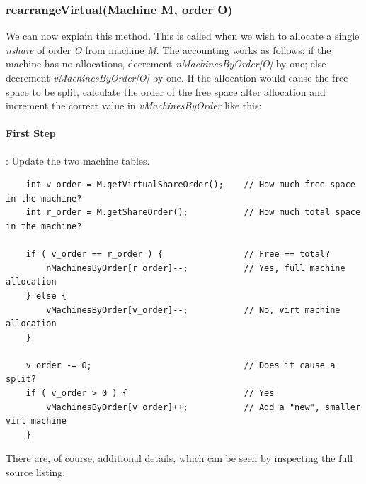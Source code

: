 \subsubsection{rearrangeVirtual(Machine M, order O)}
    We can now explain this method.  This is called when we wish to allocate a single
    {\em nshare} of order {\em O} from machine {\em M}.  The accounting works as follows:
    if the machine has no allocations, decrement {\em nMachinesByOrder[O]} by one; else
    decrement {\em vMachinesByOrder[O]} by one.  If the allocation would cause the 
    free space to be split, calculate the order of the free space after allocation and 
    increment the correct value in {\em vMachinesByOrder} like this:

    \paragraph{First Step}: Update the two machine tables.
\begin{verbatim}
    int v_order = M.getVirtualShareOrder();    // How much free space in the machine?
    int r_order = M.getShareOrder();           // How much total space in the machine?

    if ( v_order == r_order ) {                // Free == total?
        nMachinesByOrder[r_order]--;           // Yes, full machine allocation
    } else {
        vMachinesByOrder[v_order]--;           // No, virt machine allocation
    }

    v_order -= O;                              // Does it cause a split?
    if ( v_order > 0 ) {                       // Yes
        vMachinesByOrder[v_order]++;           // Add a "new", smaller virt machine
    }
\end{verbatim}
    There are, of course, additional details, which can be seen by inspecting the
    full source listing.

